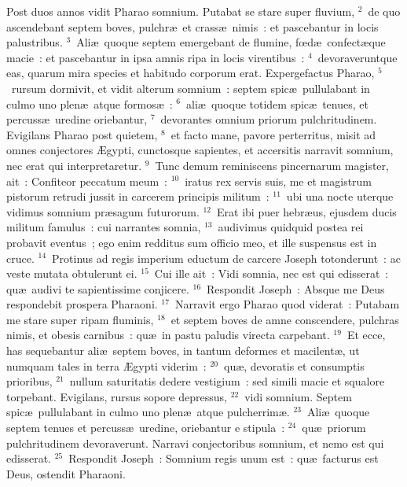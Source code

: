 \lettrine[lines=3,image=true,loversize=0.05,lraise=-0.03]{P}{}ost duos annos vidit Pharao somnium. Putabat se stare super fluvium,
${}^{2}$~de quo ascendebant septem boves, pulchr\ae\ et crass\ae\ nimis~: et pascebantur in locis palustribus.
${}^{3}$~Ali\ae\ quoque septem emergebant de flumine, fœd\ae\ confect\ae que macie~: et pascebantur in ipsa amnis ripa in locis virentibus~:
${}^{4}$~devoraveruntque eas, quarum mira species et habitudo corporum erat. Expergefactus Pharao,
${}^{5}$~rursum dormivit, et vidit alterum somnium~: septem spic\ae\ pullulabant in culmo uno plen\ae\ atque formos\ae~:
${}^{6}$~ali\ae\ quoque totidem spic\ae\ tenues, et percuss\ae\ uredine oriebantur,
${}^{7}$~devorantes omnium priorum pulchritudinem. Evigilans Pharao post quietem,
${}^{8}$~et facto mane, pavore perterritus, misit ad omnes conjectores \AE gypti, cunctosque sapientes, et accersitis narravit somnium, nec erat qui interpretaretur.
${}^{9}$~Tunc demum reminiscens pincernarum magister, ait~: Confiteor peccatum meum~:
${}^{10}$~iratus rex servis suis, me et magistrum pistorum retrudi jussit in carcerem principis militum~:
${}^{11}$~ubi una nocte uterque vidimus somnium pr\ae sagum futurorum.
${}^{12}$~Erat ibi puer hebr\ae us, ejusdem ducis militum famulus~: cui narrantes somnia,
${}^{13}$~audivimus quidquid postea rei probavit eventus~; ego enim redditus sum officio meo, et ille suspensus est in cruce.
${}^{14}$~Protinus ad regis imperium eductum de carcere Joseph totonderunt~: ac veste mutata obtulerunt ei.
${}^{15}$~Cui ille ait~: Vidi somnia, nec est qui edisserat~: qu\ae\ audivi te sapientissime conjicere.
${}^{16}$~Respondit Joseph~: Absque me Deus respondebit prospera Pharaoni.
${}^{17}$~Narravit ergo Pharao quod viderat~: Putabam me stare super ripam fluminis,
${}^{18}$~et septem boves de amne conscendere, pulchras nimis, et obesis carnibus~: qu\ae\ in pastu paludis virecta carpebant.
${}^{19}$~Et ecce, has sequebantur ali\ae\ septem boves, in tantum deformes et macilent\ae , ut numquam tales in terra \AE gypti viderim~:
${}^{20}$~qu\ae , devoratis et consumptis prioribus,
${}^{21}$~nullum saturitatis dedere vestigium~: sed simili macie et squalore torpebant. Evigilans, rursus sopore depressus,
${}^{22}$~vidi somnium. Septem spic\ae\ pullulabant in culmo uno plen\ae\ atque pulcherrim\ae .
${}^{23}$~Ali\ae\ quoque septem tenues et percuss\ae\ uredine, oriebantur e stipula~:
${}^{24}$~qu\ae\ priorum pulchritudinem devoraverunt. Narravi conjectoribus somnium, et nemo est qui edisserat.
${}^{25}$~Respondit Joseph~: Somnium regis unum est~: qu\ae\ facturus est Deus, ostendit Pharaoni.
